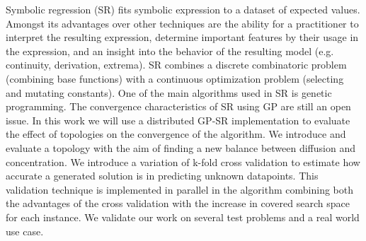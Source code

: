 Symbolic regression (SR) fits symbolic expression to a dataset of expected values.
Amongst its advantages over other techniques are the ability for a practitioner to interpret the resulting expression, determine important features by their usage in the expression, and an insight into the behavior of the resulting model (e.g. continuity, derivation, extrema).
SR combines a discrete combinatoric problem (combining base functions) with a continuous optimization problem (selecting and mutating constants).
One of the main algorithms used in SR is genetic programming. The convergence characteristics of SR using GP are still an open issue.
In this work we will use a distributed GP-SR implementation to evaluate the effect of topologies on the convergence of the algorithm.
We introduce and evaluate a topology with the aim of finding a new balance between diffusion and concentration.
We introduce a variation of k-fold cross validation to estimate how accurate a generated solution is in predicting unknown datapoints. This validation technique is implemented in parallel in the algorithm combining both the advantages of the cross validation with the increase in covered search space for each instance.
We validate our work on several test problems and a real world use case.